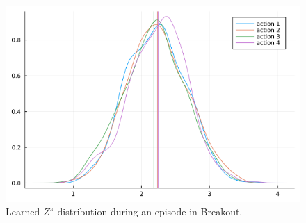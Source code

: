 \documentclass[twoside]{article}
\begin{document}
\begin{figure}[ht]
\vspace{.3in}
\includegraphics[width=\columnwidth]{qdistr_6100.png}
\vspace{.3in}
\caption{Learned \(Z^\pi\)-distribution during an episode in Breakout.}
\end{figure}






\end{document}
